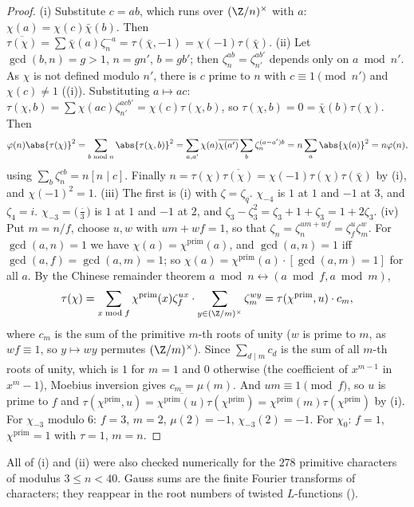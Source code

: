 \begin{proof}
(i) Substitute $c=ab$, which runs over $(\Z/n)^\times$ with $a$: $\chi(a)=\chi(c)\bar\chi(b)$. Then $\overline{\tau(\chi)}=\sum\bar\chi(a)\zeta_n^{-a}=\tau(\bar\chi,-1)=\chi(-1)\tau(\bar\chi)$.
(ii) Let $\gcd(b,n)=g>1$, $n=gn'$, $b=gb'$; then $\zeta_n^{ab}=\zeta_{n'}^{ab'}$ depends only on $a\bmod n'$. As $\chi$ is not defined modulo $n'$, there is $c$ prime to
$n$ with $c\equiv1\pmod{n'}$ and $\chi(c)\ne1$ ((i)). Substituting $a\mapsto ac$: $\tau(\chi,b)=\sum\chi(ac)\zeta_{n'}^{acb'}=\chi(c)\tau(\chi,b)$, so
$\tau(\chi,b)=0=\bar\chi(b)\tau(\chi)$. Then
\[
\varphi(n)\abs{\tau(\chi)}^2=\sum_{b\bmod n}\abs{\tau(\chi,b)}^2=\sum_{a,a'}\chi(a)\overline{\chi(a')}\sum_b\zeta_n^{(a-a')b}=n\sum_a\abs{\chi(a)}^2=n\varphi(n),
\]
using $\sum_b\zeta_n^{cb}=n[n\mid c]$. Finally $n=\tau(\chi)\overline{\tau(\chi)}=\chi(-1)\tau(\chi)\tau(\bar\chi)$ by (i), and $\chi(-1)^2=1$.
(iii) The first is (i) with $\zeta=\zeta_q$. $\chi_{-4}$ is $1$ at $1$ and $-1$ at $3$, and $\zeta_4=i$. $\chi_{-3}=\bigl(\frac\cdot3\bigr)$ is $1$ at
$1$ and $-1$ at $2$, and $\zeta_3-\zeta_3^2=\zeta_3+1+\zeta_3=1+2\zeta_3$.
(iv) Put $m=n/f$, choose $u,w$ with $um+wf=1$, so that $\zeta_n=\zeta_n^{um+wf}=\zeta_f^u\zeta_m^w$. For $\gcd(a,n)=1$ we have $\chi(a)=\chi^{\mathrm{prim}}(a)$, and $\gcd(a,n)=1$ iff
$\gcd(a,f)=\gcd(a,m)=1$; so $\chi(a)=\chi^{\mathrm{prim}}(a)\cdot[\gcd(a,m)=1]$ for all $a$. By the Chinese remainder theorem $a\bmod n\leftrightarrow(a\bmod f,a\bmod m)$,
\[
\tau(\chi)=\sum_{x\bmod f}\chi^{\mathrm{prim}}(x)\zeta_f^{ux}\cdot\sum_{y\in(\Z/m)^\times}\zeta_m^{wy}=\tau(\chi^{\mathrm{prim}},u)\cdot c_m,
\]
where $c_m$ is the sum of the primitive $m$-th roots of unity ($w$ is prime to $m$, as $wf\equiv1$, so $y\mapsto wy$ permutes $(\Z/m)^\times$). Since $\sum_{d\mid m}c_d$ is the
sum of all $m$-th roots of unity, which is $1$ for $m=1$ and $0$ otherwise (the coefficient of $x^{m-1}$ in $x^m-1$), Moebius inversion gives $c_m=\mu(m)$.
And $um\equiv1\pmod f$, so $u$ is prime to $f$ and $\tau(\chi^{\mathrm{prim}},u)=\overline{\chi^{\mathrm{prim}}(u)}\tau(\chi^{\mathrm{prim}})=\chi^{\mathrm{prim}}(m)\tau(\chi^{\mathrm{prim}})$ by (i). For $\chi_{-3}$ modulo $6$: $f=3$,
$m=2$, $\mu(2)=-1$, $\chi_{-3}(2)=-1$. For $\chi_0$: $f=1$, $\chi^{\mathrm{prim}}=1$ with $\tau=1$, $m=n$.
\end{proof}

All of (i) and (ii) were also checked numerically for the $278$ primitive characters of modulus $3\le n<40$. Gauss sums are the finite
Fourier transforms of characters; they reappear in the root numbers of twisted $L$-functions ().

